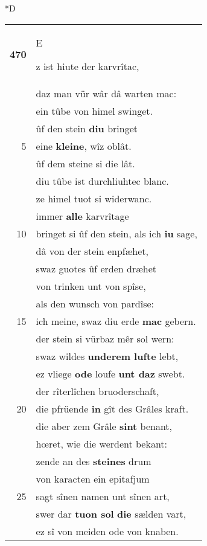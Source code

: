 \documentclass[8pt,a4paper,notitlepage]{article}
\begin{document}
\begin{table}[ht]
\begin{minipage}[t]{0.5\linewidth}
\small
\begin{center}*D
\end{center}
\begin{tabular}{rl}
\textbf{470} & \begin{large}E\end{large}z ist hiute der karvrîtac,\\ 
 & daz man vür wâr dâ warten mac:\\ 
 & ein tûbe von himel swinget.\\ 
 & ûf den stein \textbf{diu} bringet\\ 
5 & eine \textbf{kleine}, wîz oblât.\\ 
 & ûf dem steine si die lât.\\ 
 & diu tûbe ist durchliuhtec blanc.\\ 
 & ze himel tuot si widerwanc.\\ 
 & immer \textbf{alle} karvrîtage\\ 
10 & bringet si ûf den stein, als ich \textbf{iu} sage,\\ 
 & dâ von der stein enpfæhet,\\ 
 & swaz guotes ûf erden dræhet\\ 
 & von trinken unt von spîse,\\ 
 & als den wunsch von pardîse:\\ 
15 & ich meine, swaz diu erde \textbf{mac} gebern.\\ 
 & der stein si vürbaz mêr sol wern:\\ 
 & swaz wildes \textbf{underem lufte} lebt,\\ 
 & ez vliege \textbf{ode} loufe \textbf{unt daz} swebt.\\ 
 & der rîterlîchen bruoderschaft,\\ 
20 & die pfrüende \textbf{in} gît des Grâles kraft.\\ 
 & die aber zem Grâle \textbf{sint} benant,\\ 
 & hœret, wie die werdent bekant:\\ 
 & zende an des \textbf{steines} drum\\ 
 & von karacten ein epitafjum\\ 
25 & sagt sînen namen unt sînen art,\\ 
 & swer dar \textbf{tuon sol} \textbf{die} sælden vart,\\ 
 & ez sî von meiden ode von knaben.\\ 

\end{tabular}
\end{minipage}
\end{table}
\end{document}

